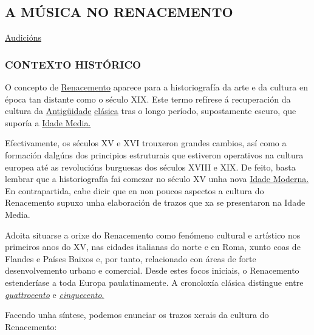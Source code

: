 \documentclass[
]{article}
\author{}
\date{}
\begin{document}
\hypertarget{a-muxfasica-no-renacemento}{%
\subsection{A MÚSICA NO RENACEMENTO}\label{a-muxfasica-no-renacemento}}

\href{http://open.spotify.com/user/javierjuradoluque/playlist/6hkvm3DeOXNPNpkdOMWdzc}{Audicións}

\hypertarget{contexto-histuxf3rico}{%
\subsubsection{CONTEXTO HISTÓRICO}\label{contexto-histuxf3rico}}

O concepto de \href{http://es.wikipedia.org/wiki/Renacimiento}{Renacemento} aparece para a historiografía da arte e da cultura en época tan distante como o século XIX. Este termo refírese á recuperación da cultura da \href{http://es.wikipedia.org/wiki/Antig\%C3\%BCedad_cl\%C3\%A1sica}{Antigüidade} \href{http://es.wikipedia.org/wiki/Antig\%C3\%BCedad_cl\%C3\%A1sica}{clásica}
tras o longo período, supostamente escuro, que suporía a \href{http://es.wikipedia.org/wiki/Edad_Media}{Idade Media.}

Efectivamente, os séculos XV e XVI trouxeron grandes cambios, así como a
formación dalgúns dos principios estruturais que estiveron operativos na
cultura europea até as revolucións burguesas dos séculos XVIII e XIX. De
feito, basta lembrar que a historiografía fai comezar no século XV unha
nova \href{http://es.wikipedia.org/wiki/Edad_Moderna}{Idade Moderna.} En
contrapartida, cabe dicir que en non poucos aspectos a cultura do
Renacemento supuxo unha elaboración de trazos que xa se presentaron na
Idade Media.

Adoita situarse a orixe do Renacemento como fenómeno cultural e
artístico nos primeiros anos do XV, nas cidades italianas do norte e en
Roma, xunto coas de Flandes e Países Baixos e, por tanto, relacionado
con áreas de forte desenvolvemento urbano e comercial. Desde estes focos
iniciais, o Renacemento estenderíase a toda Europa paulatinamente. A
cronoloxía clásica distingue entre
\href{http://es.wikipedia.org/wiki/Quattrocento}{\emph{quattrocento}} e
\href{http://es.wikipedia.org/wiki/Cinquecento}{\emph{cinquecento}.}

Facendo unha síntese, podemos enunciar os trazos xerais da cultura do
Renacemento:
\end{document}
